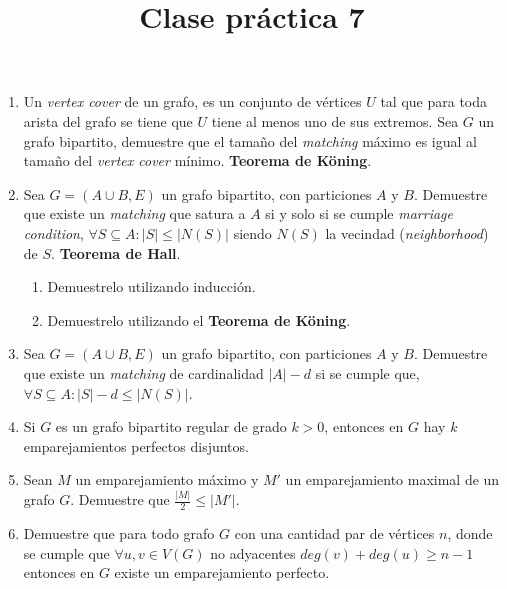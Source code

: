 \documentclass{article}
\begin{document}
\title{Clase pr\'actica 7}
\maketitle

\begin{enumerate}
    \item Un \textit{vertex cover} de un grafo, es un conjunto de vértices $U$ tal que para toda arista del grafo se tiene que $U$ tiene al menos uno de sus extremos. Sea $G$ un grafo bipartito, demuestre que el tamaño del \textit{matching} máximo es igual al tamaño del \textit{vertex cover} mínimo. \textbf{Teorema de Köning}.
    \item Sea $G=(A \cup B, E)$ un grafo bipartito, con particiones $A$ y $B$. Demuestre que existe un \textit{matching} que satura a $A$ si y solo si se cumple \textit{marriage condition}, $\forall S \subseteq A: |S| \leq |N(S)|$ siendo $N(S)$ la vecindad (\textit{neighborhood}) de $S$. \textbf{Teorema de Hall}.
    \begin{enumerate}
        \item Demuestrelo utilizando inducción.
        \item Demuestrelo utilizando el \textbf{Teorema de Köning}.
    \end{enumerate} 
    \item Sea $G=(A \cup B, E)$ un grafo bipartito, con particiones $A$ y $B$. Demuestre que existe un \textit{matching} de cardinalidad $|A| - d$ si se cumple que, $\forall S \subseteq A: |S| - d \leq |N(S)|$.
    \item Si $G$ es un grafo bipartito regular de grado $k > 0$, entonces en $G$ hay $k$ emparejamientos perfectos disjuntos.
    \item Sean $M$ un emparejamiento máximo y $M'$ un emparejamiento maximal de un grafo $G$. Demuestre que $\frac{|M|}{2} \leq |M'|$.
    \item Demuestre que para todo grafo $G$ con una cantidad par de vértices $n$, donde se cumple que $\forall u,v \in V(G)$ no adyacentes $deg(v) + deg(u) \geq n-1$ entonces en $G$ existe un emparejamiento perfecto.
\end{enumerate}
\end{document}
